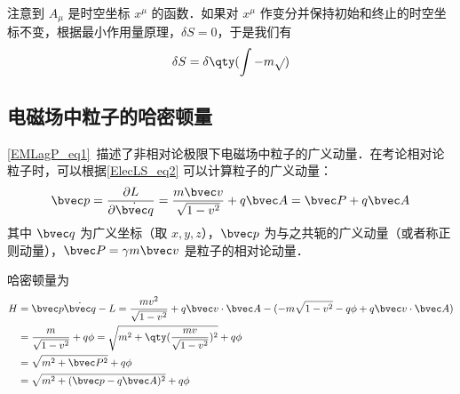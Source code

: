 注意到 $A_\mu$ 是时空坐标 $x^\mu$ 的函数．如果对 $x^\mu$ 作变分并保持初始和终止的时空坐标不变，根据最小作用量原理，$\delta S=0$，于是我们有
\begin{equation}
\delta S=\delta\qty( \int -m\sqrt{} )
\end{equation}

\subsection{电磁场中粒子的哈密顿量}
\autoref{EMLagP_eq1}~描述了非相对论极限下电磁场中粒子的广义动量．在考论相对论粒子时，可以根据\autoref{ElecLS_eq2} 可以计算粒子的广义动量：
\begin{equation}
\bvec p=\frac{\partial L}{\partial \dot {\bvec q}}=\frac{m\bvec v}{\sqrt{1-v^2}}+q\bvec A=\bvec P+q\bvec A
\end{equation}
其中 $\bvec q$ 为广义坐标（取 $x,y,z$），$\bvec p$ 为与之共轭的广义动量（或者称正则动量），$\bvec P=\gamma m\bvec v$ 是粒子的相对论动量．

哈密顿量为
\begin{equation}
\begin{aligned}
H&=\bvec p \dot{\bvec q}-L=\frac{mv^2}{\sqrt{1-v^2}}+q\bvec v\cdot \bvec A-(-m\sqrt{1-v^2}-q\phi+q\bvec v\cdot \bvec A)\\
&=\frac{m}{\sqrt{1-v^2}}+q\phi=\sqrt{m^2+\qty(\frac{mv}{\sqrt{1-v^2}})^2}+q\phi\\
&=\sqrt{m^2+\bvec P^2}+q\phi\\
&=\sqrt{m^2+(\bvec p-q\bvec A)^2}+q\phi
\end{aligned}
\end{equation}